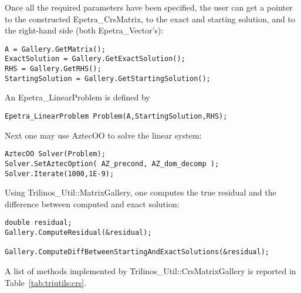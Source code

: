 Once all the required parameters have been specified, the user can get a
pointer to the constructed Epetra\_CrsMatrix, to the exact and starting
solution, and to the right-hand side (both Epetra\_Vector's):
\begin{verbatim}
A = Gallery.GetMatrix();
ExactSolution = Gallery.GetExactSolution();
RHS = Gallery.GetRHS();
StartingSolution = Gallery.GetStartingSolution();
\end{verbatim}
An Epetra\_LinearProblem is defined by
\begin{verbatim}  
Epetra_LinearProblem Problem(A,StartingSolution,RHS);
\end{verbatim}
Next one may use AztecOO to solve the linear system:
\begin{verbatim}  
AztecOO Solver(Problem);
Solver.SetAztecOption( AZ_precond, AZ_dom_decomp );  
Solver.Iterate(1000,1E-9);
\end{verbatim}
Using Trilinos\_Util::MatrixGallery, one computes the true
residual and the difference between computed and exact solution:
\begin{verbatim} 
double residual;
Gallery.ComputeResidual(&residual);
  
Gallery.ComputeDiffBetweenStartingAndExactSolutions(&residual);
\end{verbatim}
A list of methods implemented by Trilinos\_Util::CrsMatrixGallery is
reported in Table~\ref{tab:triutils:crs}.

